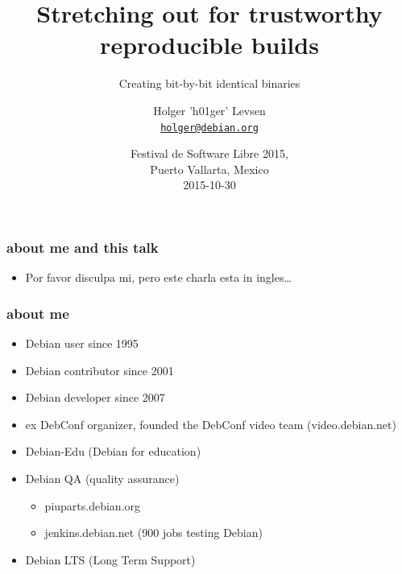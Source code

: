 \documentclass[14pt]{beamer}
\title[Reproducible builds]{Stretching out for trustworthy reproducible builds}
\subtitle{Creating bit-by-bit identical binaries}
\author[Holger Levsen]{%
   \texorpdfstring{
        Holger 'h01ger' Levsen\\
        \href{mailto:holger@debian.org}{\texttt{holger@debian.org}}
   }{Reproducible builds team}}
\institute[Debian]{}
\date[FSL.mx 2015]{%
 Festival de Software Libre 2015,\\
 Puerto Vallarta, Mexico\\
 \small
 2015-10-30}
\begin{document}
\begin{frame}
 \titlepage
\end{frame}

\begin{frame}
 \frametitle{about me and this talk}
 \begin{itemize}
  \item Por favor disculpa mi, pero este charla esta in ingles…
\end{itemize}
\end{frame}

\begin{frame}
 \frametitle{about me}

 \begin{itemize}
  \item Debian user since 1995
  \item Debian contributor since 2001
  \item Debian developer since 2007
  \item ex DebConf organizer, founded the DebConf video team (video.debian.net)
  \item Debian-Edu (Debian for education)
  \item Debian QA (quality assurance)
  \begin{itemize}
   \item piuparts.debian.org
   \item jenkins.debian.net (900 jobs testing Debian)
  \end{itemize}
  \item Debian LTS (Long Term Support)
 \end{itemize}
\end{frame}
\end{document}
